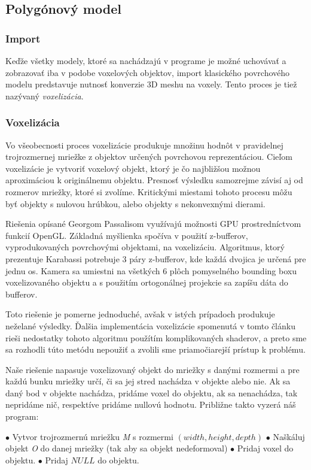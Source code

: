 \subsection{Polygónový model}
\subsubsection{Import}
Keďže všetky modely, ktoré sa nachádzajú v programe je možné uchovávať a zobrazovať iba v podobe voxelových objektov, import klasického povrchového modelu predstavuje nutnosť konverzie 3D meshu na voxely. Tento proces je tiež nazývaný \textit{voxelizácia}.
\eject
\subsubsection{Voxelizácia}
Vo všeobecnosti proces voxelizácie produkuje množinu hodnôt v pravidelnej trojrozmernej mriežke z objektov určených povrchovou reprezentáciou. Cieľom voxelizácie je vytvoriť voxelový objekt, ktorý je čo najbližšou možnou aproximáciou k originálnemu objektu. \cite{Voxelization}
Presnosť výsledku samozrejme závisí aj od rozmerov mriežky, ktoré si zvolíme. Kritickými miestami tohoto procesu môžu byť objekty s nulovou hrúbkou, alebo objekty s nekonvexnými dierami.

Riešenia opísané Georgom Passalisom \cite{Voxelization} využívajú možnosti GPU prostredníctvom funkcií OpenGL. Základná myšlienka spočíva v použití z-bufferov, vyprodukovaných povrchovými objektami, na voxelizáciu.
Algoritmus, ktorý prezentuje Karabassi potrebuje 3 páry z-bufferov, kde každá dvojica je určená pre jednu os. Kamera sa umiestni na všetkých 6 plôch pomyselného bounding boxu voxelizovaného objektu a s použitím ortogonálnej projekcie sa zapíšu dáta do bufferov. \cite{BufferVox}

Toto riešenie je pomerne jednoduché, avšak v istých prípadoch produkuje neželané výsledky. Ďalšia implementácia voxelizácie spomenutá v tomto článku rieši nedostatky tohoto algoritmu použítím komplikovaných shaderov, a preto sme sa rozhodli túto metódu nepoužiť a zvolili sme priamočiarejší prístup k problému.

Naše riešenie napasuje voxelizovaný objekt do mriežky s danými rozmermi a pre každú bunku mriežky určí, či sa jej stred nachádza v objekte alebo nie. Ak sa daný bod v objekte nachádza, pridáme voxel do objektu, ak sa nenachádza, tak nepridáme nič, respektíve pridáme nullovú hodnotu.
\eject
Približne takto vyzerá náš program: 

\begin{algorithmic}
	\State $\bullet$ Vytvor trojrozmernú mriežku \textit{M} s rozmermi $(width, height, depth)$
	\State $\bullet$ Naškáluj objekt \textit{O} do danej mriežky (tak aby sa objekt nedeformoval)
			\State $\bullet$ Pridaj voxel do objektu.
		\Else
			\State $\bullet$ Pridaj $NULL$ do objektu.
		\EndIf
	\EndFor \\
\end{algorithmic} 

